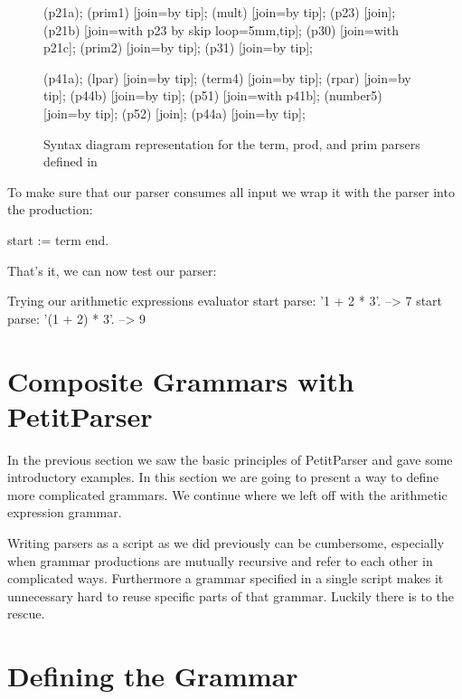 \documentclass[a4paper,10pt,twoside]{book}
\begin{document}
\begin{figure}
{{    \chainin (p21a);
    \chainin (prim1) [join=by tip];
    \chainin (mult) [join=by tip];
    \chainin (p23)    [join];
    \chainin (p21b)    [join=with p23 by {skip loop=5mm,tip}];
    \chainin (p30)    [join=with p21c];
    \chainin (prim2)    [join=by tip];
    \chainin (p31)    [join=by tip];

    \chainin (p41a);
    \chainin (lpar) [join=by tip];
    \chainin (term4) [join=by tip];
    \chainin (rpar) [join=by tip];
    \chainin (p44b)    [join=by tip];
    \chainin (p51) [join=with p41b];
    \chainin (number5) [join=by tip];
    \chainin (p52) [join];
    \chainin (p44a) [join=by tip];
  }
}
  \caption{Syntax diagram representation for the term, prod, and prim parsers defined in }
  \label{fig:syntax-arithmetic}
\end{figure}

To make sure that our parser consumes all input we wrap it with the
 parser into the  production:

\begin{code}{}
start := term end.
\end{code}

That's it, we can now test our parser:

\begin{script}{Trying our arithmetic expressions evaluator}
start parse: '1 + 2 * 3'.       --> 7
start parse: '(1 + 2) * 3'.     --> 9
\end{script}

\section{Composite Grammars with PetitParser}

In the previous section we saw the basic principles of PetitParser and
gave some introductory examples. In this section we are going to
present a way to define more complicated grammars. We continue where
we left off with the arithmetic expression grammar.

Writing parsers as a script as we did previously can be cumbersome,
especially when grammar productions are mutually recursive and refer
to each other in complicated ways. Furthermore a grammar specified in
a single script makes it unnecessary hard to reuse specific parts of
that grammar. Luckily there is  to the rescue.

\section{Defining the Grammar}
\end{document}

